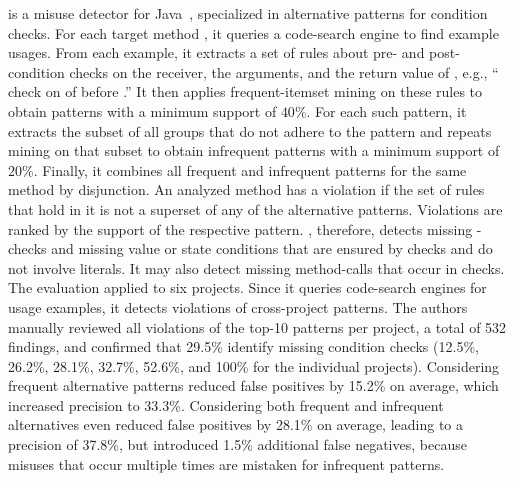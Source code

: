 \Alattin is a misuse detector for Java~\cite{TX09b}, specialized in alternative patterns for condition checks.
For each target method , it queries a code-search engine to find example usages.
From each example, it extracts a set of rules about pre- and post-condition checks on the receiver, the arguments, and the return value of , e.g.,  `` check on  of  before .''
It then applies frequent-itemset mining on these rules to obtain patterns with a minimum support of $40\%$.
For each such pattern, it extracts the subset of all groups that do not adhere to the pattern and repeats mining on that subset to obtain infrequent patterns with a minimum support of $20\%$.
Finally, it combines all frequent and infrequent patterns for the same method by disjunction.
An analyzed method has a violation if the set of rules that hold in it is not a superset of any of the alternative patterns.
Violations are ranked by the support of the respective pattern.
\Alattin, therefore, detects missing -checks and missing value or state conditions that are ensured by checks and do not involve literals.
It may also detect missing method-calls that occur in checks.
The evaluation applied \Alattin to six projects.
Since it queries code-search engines for usage examples, it detects violations of cross-project patterns.
The authors manually reviewed all violations of the top-10 patterns per project, a total of 532 findings, and confirmed that 29.5\% identify missing condition checks (12.5\%, 26.2\%, 28.1\%, 32.7\%, 52.6\%, and 100\% for the individual projects).
Considering frequent alternative patterns reduced false positives by 15.2\% on average, which increased precision to 33.3\%.
Considering both frequent and infrequent alternatives even reduced false positives by 28.1\% on average, leading to a precision of 37.8\%, but introduced 1.5\% additional false negatives, because misuses that occur multiple times are mistaken for infrequent patterns.


\vspace{0.03in}

